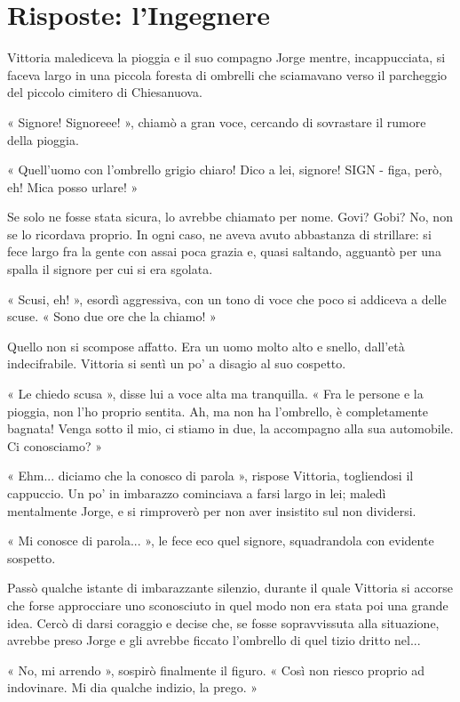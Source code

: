 \chapter{Risposte: l'Ingegnere}


Vittoria malediceva la pioggia e il suo compagno Jorge mentre, incappucciata, si faceva largo in una piccola foresta di ombrelli che sciamavano verso il parcheggio del piccolo cimitero di Chiesanuova.

« Signore! Signoreee! », chiamò a gran voce, cercando di sovrastare il rumore della pioggia.

« Quell'uomo con l'ombrello grigio chiaro! Dico a lei, signore! SIGN - figa, però, eh! Mica posso urlare! »

Se solo ne fosse stata sicura, lo avrebbe chiamato per nome. Govi? Gobi? No, non se lo ricordava proprio. In ogni caso, ne aveva avuto abbastanza di strillare: si fece largo fra la gente con assai poca grazia e, quasi saltando, agguantò per una spalla il signore per cui si era sgolata.

« Scusi, eh! », esordì aggressiva, con un tono di voce che poco si addiceva a delle scuse. « Sono due ore che la chiamo! »

Quello non si scompose affatto. Era un uomo molto alto e snello, dall'età indecifrabile. Vittoria si sentì un po' a disagio al suo cospetto.

« Le chiedo scusa », disse lui a voce alta ma tranquilla. « Fra le persone e la pioggia, non l'ho proprio sentita. Ah, ma non ha l'ombrello, è completamente bagnata! Venga sotto il mio, ci stiamo in due, la accompagno alla sua automobile. Ci conosciamo? »

« Ehm... diciamo che la conosco di parola », rispose Vittoria, togliendosi il cappuccio. Un po' in imbarazzo cominciava a farsi largo in lei; maledì mentalmente Jorge, e si rimproverò per non aver insistito sul non dividersi.

« Mi conosce di parola... », le fece eco quel signore, squadrandola con evidente sospetto.

Passò qualche istante di imbarazzante silenzio, durante il quale Vittoria si accorse che forse approcciare uno sconosciuto in quel modo non era stata poi una grande idea. Cercò di darsi coraggio e decise che, se fosse sopravvissuta alla situazione, avrebbe preso Jorge e gli avrebbe ficcato l'ombrello di quel tizio dritto nel...

« No, mi arrendo », sospirò finalmente il figuro. « Così non riesco proprio ad indovinare. Mi dia qualche indizio, la prego. »

